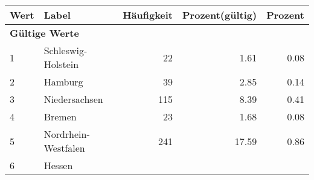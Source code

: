      \begin{longtable}{lXrrr}
     \toprule
     \textbf{Wert} & \textbf{Label} & \textbf{Häufigkeit} & \textbf{Prozent(gültig)} & \textbf{Prozent} \\
     \endhead
     \midrule
     \multicolumn{5}{l}{\textbf{Gültige Werte}}\\

     1 &
     \multicolumn{1}{X}{ Schleswig-Holstein   } &


       \num{22} &
       \num[round-mode=places,round-precision=2]{1.61} &
         \num[round-mode=places,round-precision=2]{0.08} \\

     2 &
     \multicolumn{1}{X}{ Hamburg   } &


       \num{39} &
       \num[round-mode=places,round-precision=2]{2.85} &
         \num[round-mode=places,round-precision=2]{0.14} \\

     3 &
     \multicolumn{1}{X}{ Niedersachsen   } &


       \num{115} &
       \num[round-mode=places,round-precision=2]{8.39} &
         \num[round-mode=places,round-precision=2]{0.41} \\

     4 &
     \multicolumn{1}{X}{ Bremen   } &


       \num{23} &
       \num[round-mode=places,round-precision=2]{1.68} &
         \num[round-mode=places,round-precision=2]{0.08} \\

     5 &
     \multicolumn{1}{X}{ Nordrhein-Westfalen   } &


       \num{241} &
       \num[round-mode=places,round-precision=2]{17.59} &
         \num[round-mode=places,round-precision=2]{0.86} \\

     6 &
     \multicolumn{1}{X}{ Hessen   } &



\end{longtable}
